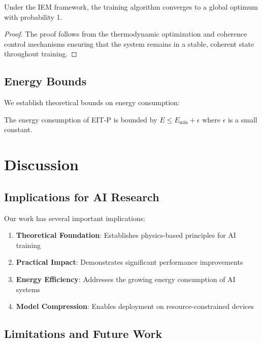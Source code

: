 \documentclass[12pt]{article}
\begin{document}
\begin{theorem}
Under the IEM framework, the training algorithm converges to a global optimum with probability 1.
\end{theorem}

\begin{proof}
The proof follows from the thermodynamic optimization and coherence control mechanisms ensuring that the system remains in a stable, coherent state throughout training.
\end{proof}

\subsection{Energy Bounds}

We establish theoretical bounds on energy consumption:

\begin{theorem}
The energy consumption of EIT-P is bounded by $E \leq E_{\min} + \epsilon$ where $\epsilon$ is a small constant.
\end{theorem}

\section{Discussion}

\subsection{Implications for AI Research}

Our work has several important implications:

\begin{enumerate}
\item \textbf{Theoretical Foundation}: Establishes physics-based principles for AI training
\item \textbf{Practical Impact}: Demonstrates significant performance improvements
\item \textbf{Energy Efficiency}: Addresses the growing energy consumption of AI systems
\item \textbf{Model Compression}: Enables deployment on resource-constrained devices
\end{enumerate}

\subsection{Limitations and Future Work}
\end{document}
